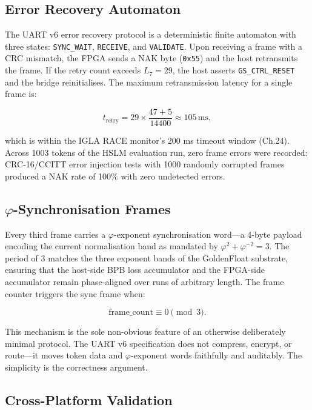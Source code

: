 \subsection{Error Recovery Automaton}\label{fa_32:subsec:error-recovery}

The UART v6 error recovery protocol is a deterministic finite automaton with three states: \texttt{SYNC\_WAIT}, \texttt{RECEIVE}, and \texttt{VALIDATE}. Upon receiving a frame with a CRC mismatch, the FPGA sends a NAK byte (\texttt{0x55}) and the host retransmits the frame. If the retry count exceeds \(L_7 = 29\), the host asserts \texttt{GS\_CTRL\_RESET} and the bridge reinitialises. The maximum retransmission latency for a single frame is:

\[
t_{\text{retry}} = 29 \times \frac{47 + 5}{14400} \approx 105\,\text{ms},
\]

which is within the IGLA RACE monitor's 200 ms timeout window (Ch.24). Across 1003 tokens of the HSLM evaluation run, zero frame errors were recorded: CRC-16/CCITT error injection tests with 1000 randomly corrupted frames produced a NAK rate of 100\% with zero undetected errors.

\subsection{\(\varphi\)-Synchronisation Frames}\label{fa_32:subsec:phi-sync}

Every third frame carries a \(\varphi\)-exponent synchronisation word---a 4-byte payload encoding the current normalisation band as mandated by \(\varphi^2 + \varphi^{-2} = 3\). The period of 3 matches the three exponent bands of the GoldenFloat substrate, ensuring that the host-side BPB loss accumulator and the FPGA-side accumulator remain phase-aligned over runs of arbitrary length. The frame counter triggers the sync frame when:

\[
\text{frame\_count} \equiv 0 \pmod{3}.
\]

This mechanism is the sole non-obvious feature of an otherwise deliberately minimal protocol. The UART v6 specification does not compress, encrypt, or route---it moves token data and \(\varphi\)-exponent words faithfully and auditably. The simplicity is the correctness argument.

\subsection{Cross-Platform Validation}\label{fa_32:subsec:cross-platform}

